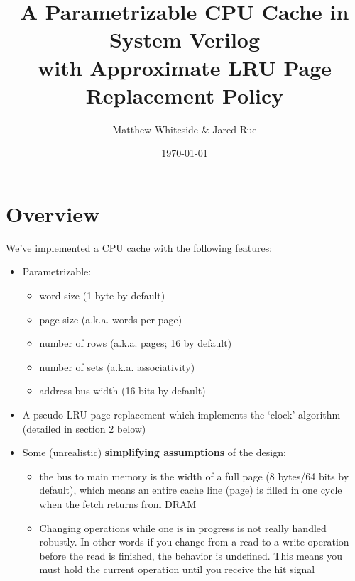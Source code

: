 \documentclass{article}
\title{	
\LARGE A Parametrizable CPU Cache in System Verilog \\
\large with Approximate LRU Page Replacement Policy 
\horrule{0.5pt} \\[0.5cm] %
}
\author{Matthew Whiteside \& Jared Rue} %
\date{\normalsize\today} %
\begin{document}
\maketitle %




\section{Overview}

We've implemented a CPU cache with the following features: 
\begin{itemize}
	\item Parametrizable:
		\begin{itemize}
			\item word size (1 byte by default)
			\item page size (a.k.a. words per page)
			\item number of rows (a.k.a. pages; 16 by default)
			\item number of sets (a.k.a. associativity)
			\item address bus width (16 bits by default)
		\end{itemize}
	\item A pseudo-LRU page replacement which implements the `clock' algorithm (detailed in section 2 below)
	\item Some (unrealistic) \textbf{simplifying assumptions} of the design:
		\begin{itemize}
			\item the bus to main memory is the width of a full page (8 bytes/64 bits by default), which means an entire cache line (page) is filled in one cycle when the fetch returns from DRAM
			\item Changing operations while one is in progress is not really handled robustly.  In other words if you change from a read to a write operation before the read is finished, the behavior is undefined.  This means you must hold the current operation until you receive the hit signal
		\end{itemize}

\end{itemize}  
\end{document}
